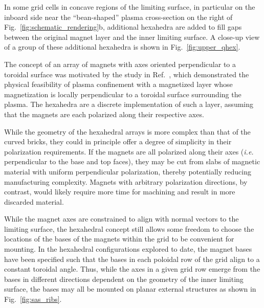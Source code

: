 \documentclass[11pt,onecolumn]{article}
\begin{document}
In some grid cells in concave regions of the limiting 
surface, in particular on the inboard side near the ``bean-shaped'' 
plasma cross-section on the right of Fig.~\ref{fig:schematic_rendering}b,
additional hexahedra are added to fill gaps between the original magnet layer
and the inner limiting surface. A close-up view of a group of these additional
hexahedra is shown in Fig.~\ref{fig:upper_qhex}.

The concept of an array of magnets with axes oriented perpendicular to a
toroidal surface was motivated by the study in Ref.~\cite{zhu2020a}, which 
demonstrated the physical feasibility of plasma confinement with a magnetized 
layer whose magnetization is locally perpendicular to a toroidal surface 
surrounding the plasma. The hexahedra are a discrete implementation of such a 
layer, assuming that the magnets are each polarized along their respective
axes.

While the geometry of the hexahedral arrays is more complex than that of the
curved bricks, they could in principle offer a degree of simplicity in 
their polarization requirements. If the magnets are all polarized along
their axes (\textit{i.e.} perpendicular to the base and top faces), they may be 
cut from slabs of magnetic material with uniform
perpendicular polarization, thereby potentially reducing manufacturing 
complexity. Magnets with arbitrary polarization directions, by contrast,
would likely require more time for machining and result in more discarded 
material.

While the magnet axes are constrained to align with normal vectors to the 
limiting surface, the hexahedral concept still allows some freedom to choose
the locations of the bases of the magnets within the grid to be convenient
for mounting. In the hexahedral configurations explored to date, the 
magnet bases have been specified such that the bases in each poloidal row of
the grid align to a constant toroidal angle. Thus, while the axes in a
given grid row emerge from the bases in different directions dependent on 
the geometry of the inner limiting surface, the bases may all be mounted on 
planar external structures as shown in Fig.~\ref{fig:sas_ribs}.
\end{document}
